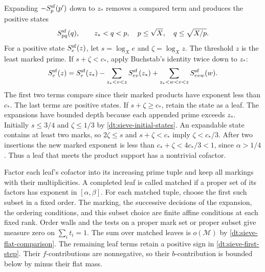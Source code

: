 \documentclass[11pt,a4paper]{article}
\theoremstyle{paperplain}
\numberwithin{equation}{section}
\begin{document}
Expanding \(-S_p^{\rm sf}(p')\) down to \(z_*\) removes a
compared term and produces the positive states
\begin{equation}
 S_{pq}^{\rm sf}(q),\qquad
 z_*<q<p,\quad p\le\sqrt X,\quad q\le\sqrt{X/p}.
 \label{dt:sieve-initial-states}
\end{equation}
For a positive state \(S_e^{\rm sf}(z)\), let
\(s=\log_X e\) and \(\zeta=\log_X z\). The threshold \(z\)
is the least marked prime. If \(s+\zeta<c_*\), apply
Buchstab's identity twice down to \(z_*\):
\begin{equation}
 S_e^{\rm sf}(z)
   =S_e^{\rm sf}(z_*)-
        \sum_{z_*<v<z} S_{ev}^{\rm sf}(z_*)+
        \sum_{z_*<w<v<z} S_{evw}^{\rm sf}(w).
 \label{dt:sieve-two-step}
\end{equation}
The first two terms compare since their marked products
have exponent less than \(c_*\). The last terms are
positive states. If \(s+\zeta\ge c_*\), retain the state
as a leaf. The expansions have bounded depth because each
appended prime exceeds \(z_*\). Initially \(s\le3/4\) and
\(\zeta\le1/3\) by \eqref{dt:sieve-initial-states}. An expandable state contains at least two marks, so $2\zeta\le s$ and
$s+\zeta<c_*$ imply $\zeta<c_*/3$. After two insertions the new
marked exponent is less than $c_*+\zeta<4c_*/3<1$, since $\alpha>1/4$. Thus a leaf
that meets the product support has a nontrivial cofactor.

Factor each leaf's cofactor into its increasing prime tuple
and keep all markings with their multiplicities. A completed
leaf is called matched if a proper set of its factors has
exponent in \([\alpha,\beta]\). For each matched tuple,
choose the first such subset in a fixed order. The marking,
the successive decisions of the expansion, the ordering
conditions, and this subset choice are finite affine conditions
at each fixed rank. Order walls and the tests on a proper
mark set or proper subset give measure zero on \(\sum_i t_i=1\).
The sum over matched leaves is
\(o(\mathcal M)\) by \eqref{dt:sieve-flat-comparison}.
The remaining leaf terms retain a positive sign in
\eqref{dt:sieve-first-step}. Their \(f\)-contributions
are nonnegative, so their \(b\)-contribution is bounded
below by minus their flat mass.
\end{document}
